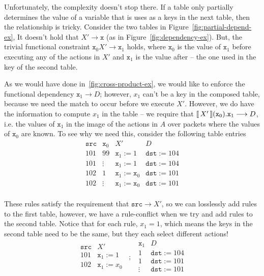 Unfortunately, the complexity doesn't stop there. If a table only
partially determines the value of a variable that is uses as a keys in
the next table, then the relationship is tricky. Consider the two
tables in Figure~\ref{fig:partial-depend-ex}, It doesn't hold that
$X' \longrightarrow \texttt{x}$ (as in
Figure~\ref{fig:dependency-ex}). But, the trivial functional
constraint $\texttt{x}_0X' \longrightarrow \texttt{x}_1$
holds, where $\texttt{x}_0$ is the value of $\texttt{x}_1$ before
executing any of the actions in $X'$ and $\texttt{x}_1$ is the value
after -- the one used in the key of the second table.

As we would have done in~\ref{fig:cross-product-ex}, we would like to
enforce the functional dependency $\texttt{x}_1 \longrightarrow D$;
however, $x_1$ can't be a key in the composed table, because we need
the match to occur before we execute $X'$. However, we do have the
information to compute $x_1$ in the table -- we require that
$\llbracket\,X'\,\rrbracket(\texttt{x}_0).\texttt{x}_1\longrightarrow D$, i.e. the
values of $\texttt{x}_1$ in the image of the actions in $A$ over
packets where the values of $\texttt{x}_0$ are known. To see why we
need this, consider the following table entries
\[
  \begin{array}{c|c|c|c}
    \texttt{src} & \texttt{x}_0 & X' & D\\ \hline
    101 & 99 & \texttt{x}_1 := 1 & \texttt{dst} := 104 \\
    101 & \vdots & \texttt{x}_1 := 1 & \texttt{dst} := 104 \\
    102 & 1 & \texttt{x}_1 := \texttt{x}_0 & \texttt{dst} := 101 \\
    102 & \vdots & \texttt{x}_1 := \texttt{x}_0 & \texttt{dst} := 101 \\
  \end{array}
\]

These rules satisfy the requirement that
$\texttt{src}\longrightarrow X'$, so we can losslessly add rules to
the first table, however, we have a rule-conflict when we try and add
rules to the second table. Notice that for each rule, $x_1 = 1$, which
means the keys in the second table need to be the same, but they each
select different actions!
\[
  \begin{array}{c|c}
    \texttt{src} & X'\\ \hline
    101 & \texttt{x}_1 := 1  \\
    102 & \texttt{x}_1 := x_0 \\
  \end{array}\enspace ; \enspace
  \begin{array}{c|c}
    \texttt{x}_1 & D\\ \hline
    1 & \texttt{dst} := 104 \\
    1 & \texttt{dst} := 101 \\
    \vdots & \texttt{dst} := 101 \\
  \end{array}  
\]

